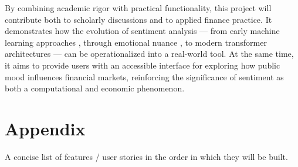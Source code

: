 \documentclass[12pt]{article}
\begin{document}
By combining academic rigor with practical functionality, this project will contribute both to scholarly 
discussions and to applied finance practice. It demonstrates how the evolution of sentiment analysis — 
from early machine learning approaches \cite{10.3115/1118693.1118704}, through emotional nuance 
\cite{SentimentEmotionSurvey2021}, to modern transformer architectures 
\cite{10.1145/3586075,10.1145/3543873.3587605} — can be operationalized into a real-world tool. At the 
same time, it aims to provide users with an accessible interface for exploring how public mood 
influences financial markets, reinforcing the significance of sentiment as both a computational and 
economic phenomenon.

\newpage
\section*{Appendix}
A concise list of features / user stories in the order in which they will be built.
\end{document}
